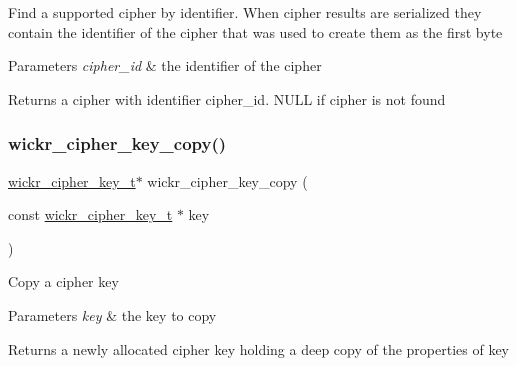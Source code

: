 Find a supported cipher by identifier. When cipher results are serialized they contain the identifier of the cipher that was used to create them as the first byte


\begin{DoxyParams}{Parameters}
{\em cipher\+\_\+id} & the identifier of the cipher \\
\hline
\end{DoxyParams}
\begin{DoxyReturn}{Returns}
a cipher with identifier \textquotesingle{}cipher\+\_\+id\textquotesingle{}. N\+U\+LL if cipher is not found 
\end{DoxyReturn}
\mbox{\label{group__wickr__cipher_gaa473bc83f82d6353aa6f4cb4e36bf4f0}} 
\subsubsection{\texorpdfstring{wickr\+\_\+cipher\+\_\+key\+\_\+copy()}{wickr\_cipher\_key\_copy()}}
{\footnotesize\ttfamily \hyperlink{structwickr__cipher__key}{wickr\+\_\+cipher\+\_\+key\+\_\+t}$\ast$ wickr\+\_\+cipher\+\_\+key\+\_\+copy (\begin{DoxyParamCaption}\item[{const \hyperlink{structwickr__cipher__key}{wickr\+\_\+cipher\+\_\+key\+\_\+t} $\ast$}]{key }\end{DoxyParamCaption})}

Copy a cipher key


\begin{DoxyParams}{Parameters}
{\em key} & the key to copy \\
\hline
\end{DoxyParams}
\begin{DoxyReturn}{Returns}
a newly allocated cipher key holding a deep copy of the properties of \textquotesingle{}key\textquotesingle{} 
\end{DoxyReturn}
\mbox{\label{group__wickr__cipher_ga73e2a916ba0ff19517e30a65a68390f0}} 
